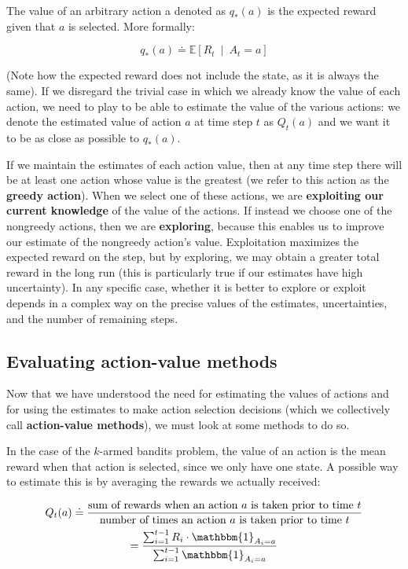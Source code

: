 The value of an arbitrary action a denoted as $q_*(a)$ is the expected reward given that $a$ is selected. More formally:

\begin{equation*}
    q_*(a) \doteq \mathbb{E} \left[ R_t \  \middle\vert \  A_t = a \right]
\end{equation*}

(Note how the expected reward does not include the state, as it is always the same). If we disregard the trivial case in which we already know the value of each action, we need to play to be able to estimate the value of the various actions: we denote the estimated value of action $a$ at time step $t$ as $Q_t(a)$ and we want it to be as close as possible to $q_*(a)$.

If we maintain the estimates of each action value, then at any time step there will be at least one action whose value is the greatest (we refer to this action as the \textbf{greedy action}). When we select one of these actions, we are \textbf{exploiting our current knowledge} of the value of the actions. If instead we choose one of the nongreedy actions, then we are \textbf{exploring}, because this enables us to improve our estimate of the nongreedy action’s value. Exploitation maximizes the expected reward on the step, but by exploring, we may obtain a greater total reward in the long run (this is particularly true if our estimates have high uncertainty). In any specific case, whether it is better to explore or exploit depends in a complex way on the precise values of the estimates, uncertainties, and the number of remaining steps.

\subsection{Evaluating action-value methods}
Now that we have understood the need for estimating the values of actions and for using the estimates to make action selection decisions (which we collectively call \textbf{action-value methods}), we must look at some methods to do so.

In the case of the $k$-armed bandits problem, the value of an action is the mean reward when that action is selected, since we only have one state. A possible way to estimate this is by averaging the rewards we actually received:

\begin{gather}
    Q_t(a) \doteq \frac{\text{sum of rewards when an action } a \text{ is taken prior to time } t}{\text{number of times an action } a \text{ is taken prior to time } t}\nonumber\\
    = \frac{\sum_{i=1}^{t-1} R_i \cdot \mathbbm{1}_{A_i = a}}{\sum_{i=1}^{t-1} \mathbbm{1}_{A_i = a}}
    \label{eq:ch3-sampleaveragemethod}
\end{gather}

